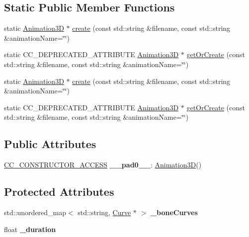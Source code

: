 \subsection*{Static Public Member Functions}
\begin{DoxyCompactItemize}
\item 
static \hyperlink{classAnimation3D}{Animation3D} $\ast$ \hyperlink{classAnimation3D_a3abe67768d733db99aaa5a6b1a8a3d3f}{create} (const std\+::string \&filename, const std\+::string \&animation\+Name=\char`\"{}\char`\"{})
\item 
static C\+C\+\_\+\+D\+E\+P\+R\+E\+C\+A\+T\+E\+D\+\_\+\+A\+T\+T\+R\+I\+B\+U\+TE \hyperlink{classAnimation3D}{Animation3D} $\ast$ \hyperlink{classAnimation3D_af6fb0fdb968cd2a67b9e376e9a9d9b1d}{get\+Or\+Create} (const std\+::string \&filename, const std\+::string \&animation\+Name=\char`\"{}\char`\"{})
\item 
static \hyperlink{classAnimation3D}{Animation3D} $\ast$ \hyperlink{classAnimation3D_a43d40453c37ad04b1624008a7cccd01b}{create} (const std\+::string \&filename, const std\+::string \&animation\+Name=\char`\"{}\char`\"{})
\item 
static C\+C\+\_\+\+D\+E\+P\+R\+E\+C\+A\+T\+E\+D\+\_\+\+A\+T\+T\+R\+I\+B\+U\+TE \hyperlink{classAnimation3D}{Animation3D} $\ast$ \hyperlink{classAnimation3D_af6fb0fdb968cd2a67b9e376e9a9d9b1d}{get\+Or\+Create} (const std\+::string \&filename, const std\+::string \&animation\+Name=\char`\"{}\char`\"{})
\end{DoxyCompactItemize}
\subsection*{Public Attributes}
\begin{DoxyCompactItemize}
\item 
\mbox{\label{classAnimation3D_ac236dbd1854ed0e5af98b5587f73215c}} 
\hyperlink{_2cocos2d_2cocos_2base_2ccConfig_8h_a25ef1314f97c35a2ed3d029b0ead6da0}{C\+C\+\_\+\+C\+O\+N\+S\+T\+R\+U\+C\+T\+O\+R\+\_\+\+A\+C\+C\+E\+SS} {\bfseries \+\_\+\+\_\+pad0\+\_\+\+\_\+}\+: \hyperlink{classAnimation3D}{Animation3D}()
\end{DoxyCompactItemize}
\subsection*{Protected Attributes}
\begin{DoxyCompactItemize}
\item 
\mbox{\label{classAnimation3D_acfa0988a3717ddc7d4da3e517dc8dc2a}} 
std\+::unordered\+\_\+map$<$ std\+::string, \hyperlink{classAnimation3D_1_1Curve}{Curve} $\ast$ $>$ {\bfseries \+\_\+bone\+Curves}
\item 
\mbox{\label{classAnimation3D_a9e72b882521b7a23fa551aa7528bdfd9}} 
float {\bfseries \+\_\+duration}
\end{DoxyCompactItemize}
